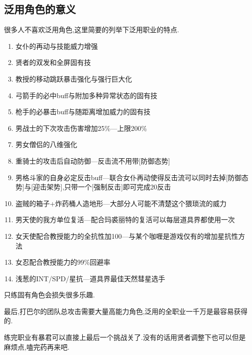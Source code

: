 	\subsection{泛用角色的意义}

	很多人不喜欢泛用角色,这里简要的列举下泛用职业的特点.

	\begin{enumerate}
		\item 女仆的再动与技能威力增强
		\item 贤者的双发和全屏固有技
		\item 教授的移动跳跃暴击强化与强行巨大化
		\item 弓箭手的必中buff与附加多种异常状态的固有技
		\item 枪手的必暴击buff与随距离增加威力的固有技
		\item 男战士的下次攻击伤害增加25\%---上限200\%
		\item 男女僧侣的八维强化
		\item 重骑士的攻击后自动防御---反击流不用带[防御态势]
		\item 男格斗家的自身必定反击buff---联合女仆再动使得反击流可以同时去掉[防御态势]与[迎击架势],只带一个[强制反击]即可完成20反击
		\item 盗贼的箱子+炸药桶人造地形---大部分人可能不清楚这个猥琐流的威力
		\item 男天使的我方单位复活---配合玛裘丽特的复活可以每层道具界都使用一次
		\item 女天使配合教授能力的全抗性加100---与某个咖喱是游戏仅有的增加星抗性方法
		\item 女忍配合教授能力的99\%回避率
		\item 浅葱的INT/SPD/星抗---道具界最佳天然彗星选手
	\end{enumerate}
	
	只练固有角色会损失很多乐趣.

	最后,打巴尔的团队总攻击需要大量高能力角色,泛用的全职业一千万是最容易获得的.

练完职业有暴君可以直接上最后一个挑战关了.没有的话用贤者调整下也可以但是麻烦点,嗑完药再来吧.
